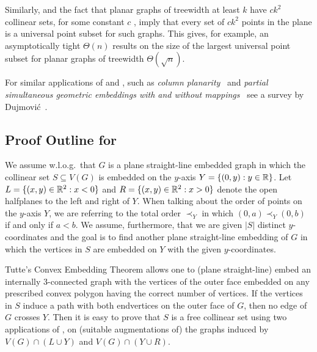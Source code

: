 Similarly,  and the fact that planar graphs of treewidth at least
$k$ have $c k^2$ collinear sets, for some constant $c$
\cite{dalozzo.dujmovic.ea:drawing}, imply that every set of  $c k^2$ points in the plane is a universal point subset for  such graphs. This gives, for example, an
asymptotically tight 
$\Theta(n)$ results on the size of the largest universal
point subset for planar graphs of treewidth $\Theta(\sqrt{n})$.


For similar applications of  and , such
as \emph{column planarity}~\cite{behks-cppsge-17,dalozzo.dujmovic.ea:drawing,dujmovic:utility}
and \emph{partial simultaneous geometric embeddings with and without
  mappings}~\cite{behks-cppsge-17,ddlmw-pqp-15,dujmovic:utility} see a survey by
Dujmovi\'c~\cite{dujmovic:utility}.



\subsection{Proof Outline for }

We assume w.l.o.g.\ that $G$ is a plane straight-line
embedded graph in which the collinear set $S\subseteq V(G)$ is embedded
on the $y$-axis $Y=\{(0,y):y\in\mathbb{R}\}$. Let
$L=\{(x,y)\in\mathbb{R}^2:x<0\}$ and $R=\{(x,y)\in\mathbb{R}^2: x >0\}$ denote the open
halfplanes to the left and right of $Y$. When talking about the order of points on the $y$-axis $Y$, we are referring to the total order $\prec_Y$ in which $(0,a) \prec_Y (0,b)$ if and only if $a<b$. We assume, furthermore, that we are given $|S|$ distinct $y$-coordinates and the goal is to find another plane straight-line embedding of $G$ in which the vertices in $S$ are embedded on $Y$ with the given $y$-coordinates.

Tutte's Convex Embedding Theorem \cite{tutte:how} allows one to (plane
straight-line) embed an internally 3-connected graph with the vertices
of the outer face embedded on any prescribed convex polygon having the
correct number of vertices.  If the vertices in $S$ induce a path with
both endvertices on the outer face of $G$, then no edge of $G$ crosses
$Y$. Then it is easy to prove that $S$ is a free
collinear set using two applications of \cite{tutte:how}, on (suitable augmentations of) the graphs induced
by $V(G)\cap(L\cup Y)$ and $V(G)\cap(Y\cup R)$.

